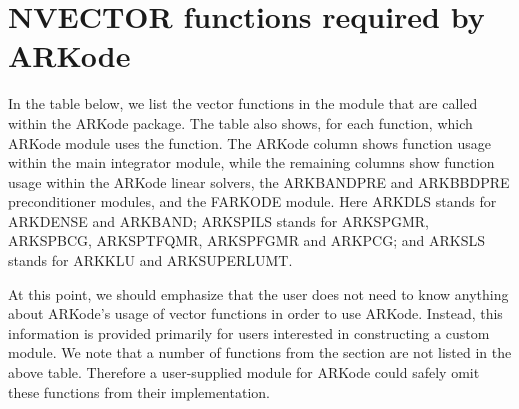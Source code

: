 \documentclass[letterpaper,10pt,english]{sphinxmanual}
\begin{document}
\section{NVECTOR functions required by ARKode}
\label{nvectors/ARKode_requirements::doc}\label{nvectors/ARKode_requirements:nvector-functions-required-by-arkode}\label{nvectors/ARKode_requirements:nvectors-arkode}
In the table below, we list the vector functions in the 
module that are called within the ARKode package.  The table also
shows, for each function, which ARKode module uses the function.
The ARKode column shows function usage within the main integrator
module,  while the remaining columns show function usage within
the ARKode linear solvers, the ARKBANDPRE and ARKBBDPRE
preconditioner modules, and the FARKODE module.  Here ARKDLS stands
for ARKDENSE and ARKBAND; ARKSPILS stands for ARKSPGMR, ARKSPBCG,
ARKSPTFQMR, ARKSPFGMR and ARKPCG; and ARKSLS stands for ARKKLU and
ARKSUPERLUMT.

At this point, we should emphasize that the user does not need to know
anything about ARKode's usage of vector functions in order to use
ARKode.  Instead, this information is provided primarily for users
interested in constructing a custom  module.  We note that
a number of  functions from the section
{\hyperref[nvectors/index:nvectors-description]{\emph{}}} are not listed in the above table.
Therefore a user-supplied  module for ARKode could safely
omit these functions from their implementation.
\end{document}
